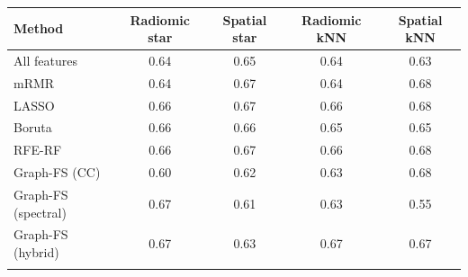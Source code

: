 \begin{tabular}{@{}lcccc@{}}
\toprule
Method & Radiomic star & Spatial star & Radiomic kNN & Spatial kNN \\
\midrule
All features & 0.64 & 0.65 & 0.64 & 0.63 \\
mRMR & 0.64 & 0.67 & 0.64 & 0.68 \\
LASSO & 0.66 & 0.67 & 0.66 & 0.68 \\
Boruta & 0.66 & 0.66 & 0.65 & 0.65 \\
RFE-RF & 0.66 & 0.67 & 0.66 & 0.68 \\
Graph-FS (CC) & 0.60 & 0.62 & 0.63 & 0.68 \\
Graph-FS (spectral) & 0.67 & 0.61 & 0.63 & 0.55 \\
Graph-FS (hybrid) & 0.67 & 0.63 & 0.67 & 0.67 \\
\botrule
\end{tabular}
